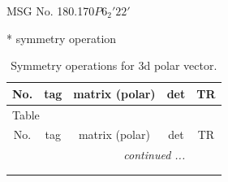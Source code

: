 \documentclass[fleqn,8pt]{jsarticle}
\begin{document}
\setcounter{MaxMatrixCols}{32}

\renewcommand{\tablename}{Table~}
\renewcommand{\figurename}{Figure~}
\begin{center}
\LARGE
MSG No. 180.170\quad$P6_{2}'22'$
\end{center}
* symmetry operation
\renewcommand{\arraystretch}{1.3}
\begin{longtable}{ccccc}
\caption{Symmetry operations for 3d polar vector.}
 \\
 \hline \hline
No. & tag & matrix (polar) & det & TR \\ \hline \endfirsthead

\multicolumn{4}{l}{\tablename\ \thetable{}} \\
 \hline \hline
No. & tag & matrix (polar) & det & TR \\ \hline \endhead

 \hline \hline
\multicolumn{4}{r}{\footnotesize\it continued ...} \\ \endfoot

 \hline \hline
\multicolumn{4}{r}{} \\ \endlastfoot


\end{longtable}
\end{document}
